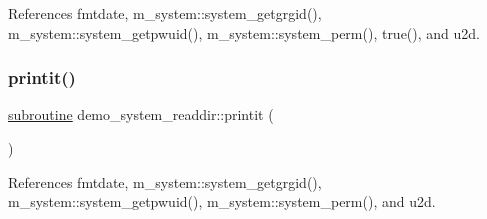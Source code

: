 References fmtdate, m\+\_\+system\+::system\+\_\+getgrgid(), m\+\_\+system\+::system\+\_\+getpwuid(), m\+\_\+system\+::system\+\_\+perm(), true(), and u2d.

\mbox{\label{__ls_8f90_a776aaa5526c5060cfed769a9836bd8da}} 
\subsubsection{\texorpdfstring{printit()}{printit()}}
{\footnotesize\ttfamily \hyperlink{M__stopwatch_83_8txt_acfbcff50169d691ff02d4a123ed70482}{subroutine} demo\+\_\+system\+\_\+readdir\+::printit (\begin{DoxyParamCaption}{ }\end{DoxyParamCaption})}



References fmtdate, m\+\_\+system\+::system\+\_\+getgrgid(), m\+\_\+system\+::system\+\_\+getpwuid(), m\+\_\+system\+::system\+\_\+perm(), and u2d.

